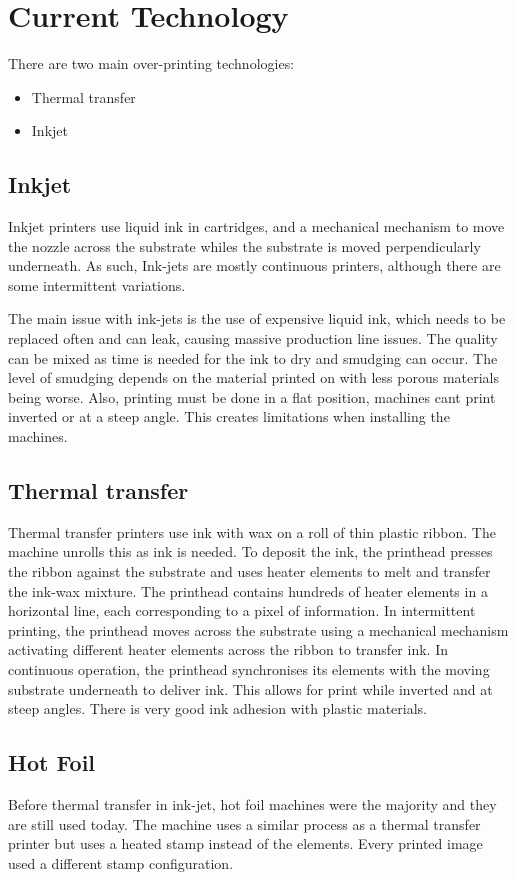 \chapter{Current Technology}
\pagestyle{fancy}

There are two main over-printing technologies:

\begin{itemize}
    \item Thermal transfer
    \item Inkjet
  \end{itemize}

  \section{Inkjet}

  Inkjet printers use liquid ink in cartridges, and a  mechanical mechanism to move the nozzle across the substrate whiles the substrate is moved perpendicularly underneath. As such, Ink-jets are mostly continuous printers, although there are some intermittent variations.

  The main issue with ink-jets is the use of expensive liquid ink, which needs to be replaced often and can leak, causing massive production line issues. The quality can be mixed as time is needed for the ink to dry and smudging can occur. The level of smudging depends on the material printed on with less porous materials being worse. Also, printing must be done in a flat position, machines cant print inverted or at a steep angle. This creates limitations when installing the machines.


  \section{Thermal transfer}

  Thermal transfer printers use ink with wax on a roll of thin plastic ribbon. The machine unrolls this as ink is needed. To deposit the ink, the printhead presses the ribbon against the substrate and uses heater elements to melt and transfer the ink-wax mixture. 
  The printhead contains hundreds of heater elements in a horizontal line, each corresponding to a pixel of information.
  In intermittent printing, the printhead moves across the substrate using a mechanical mechanism activating different heater elements across the ribbon to transfer ink. 
  In continuous operation, the printhead synchronises its elements with the moving substrate underneath to deliver ink. This allows for print while inverted and at steep angles. There is very good ink adhesion with plastic materials. 
  
  \section{Hot Foil}

  Before thermal transfer in ink-jet, hot foil machines were the majority and they are still used today. The machine uses a similar process as a thermal transfer printer but uses a heated stamp instead of the elements. Every printed image used a different stamp configuration.
